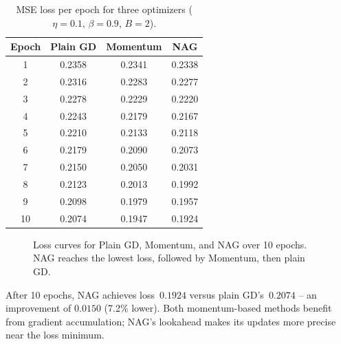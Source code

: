 \documentclass[runningheads]{llncs}
\begin{document}
\begin{table}[h]
\centering
\caption{MSE loss per epoch for three optimizers ($\eta=0.1$, $\beta=0.9$, $B=2$).}
\label{tab:optimizers}
\begin{tabular}{cccc}
\toprule
Epoch & Plain GD & Momentum & NAG\\
\midrule
1  & 0.2358 & 0.2341 & 0.2338\\
2  & 0.2316 & 0.2283 & 0.2277\\
3  & 0.2278 & 0.2229 & 0.2220\\
4  & 0.2243 & 0.2179 & 0.2167\\
5  & 0.2210 & 0.2133 & 0.2118\\
6  & 0.2179 & 0.2090 & 0.2073\\
7  & 0.2150 & 0.2050 & 0.2031\\
8  & 0.2123 & 0.2013 & 0.1992\\
9  & 0.2098 & 0.1979 & 0.1957\\
10 & 0.2074 & 0.1947 & 0.1924\\
\bottomrule
\end{tabular}
\end{table}

\begin{figure}[h]
\centering
{}
\caption{Loss curves for Plain GD, Momentum, and NAG over 10 epochs.
NAG reaches the lowest loss, followed by Momentum, then plain GD.}
\label{fig:optimizers}
\end{figure}

After 10 epochs, NAG achieves loss~$0.1924$ versus plain GD's~$0.2074$ --
an improvement of $0.0150$ (7.2\% lower). Both momentum-based methods
benefit from gradient accumulation; NAG's lookahead makes its updates more
precise near the loss minimum.
\end{document}
